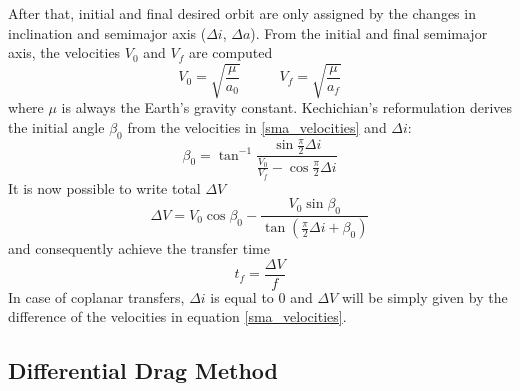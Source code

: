 After that, initial and final desired orbit are only assigned by the changes in inclination and semimajor axis ($\Delta i$, $\Delta a$).
From the initial and final semimajor axis, the velocities $V_0$ and $V_f$ are computed 
\begin{equation} \label{sma_velocities}
    V_0 = \sqrt{\frac{\mu}{a_0}} \;\;\;\;\;\;\;\;\;\; V_f = \sqrt{\frac{\mu}{a_f}}
\end{equation}
where $\mu$ is always the Earth's gravity constant.
Kechichian's reformulation derives the initial angle $\beta_0$ from the velocities in \ref{sma_velocities} and $\Delta i$:
\begin{equation} \label{beta0}
    \beta_0 = \tan^{-1}{\frac{\sin{\frac{\pi}{2}}\Delta i}{\frac{V_0}{V_f} - \cos{\frac{\pi}{2}}\Delta i}}
\end{equation}
It is now possible to write total $\Delta V$
\begin{equation} \label{deltaV}
    \Delta V = V_0 \cos{\beta_0} - \frac{V_0 \sin{\beta_0}}{\tan{\left(\frac{\pi}{2}\Delta i + \beta_0\right)}}
\end{equation}
and consequently achieve the transfer time
\begin{equation} \label{transfer_time}
    t_f = \frac{\Delta V}{f}
\end{equation}
In case of coplanar transfers, $\Delta i$ is equal to 0 and $\Delta V$ will be simply given by the difference of the velocities in equation \ref{sma_velocities}.




\subsection{Differential Drag Method}


